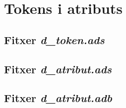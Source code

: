 \section{Tokens i atributs}

\subsection{Fitxer \emph{d\_token.ads}}

\newpage

\subsection{Fitxer \emph{d\_atribut.ads}}

\newpage

\subsection{Fitxer \emph{d\_atribut.adb}}

\newpage
